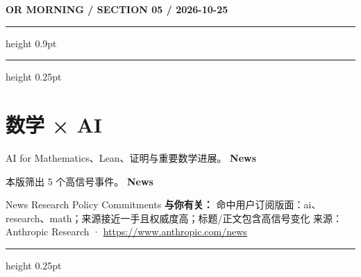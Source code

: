 \documentclass[10.5pt]{ctexart}
\begin{document}
\newpage
{\small\bfseries OR MORNING / SECTION 05 / 2026-10-25}
\vspace{2mm}
\hrule height 0.9pt
\vspace{1.5mm}
\hrule height 0.25pt
\vspace{4mm}
\section*{数学 × AI}
{\color{ormuted} AI for Mathematics、Lean、证明与重要数学进展。}
\vspace{2mm}
{\LARGE\bfseries News}\par
\vspace{1mm}
{\color{ormuted} 本版筛出 5 个高信号事件。}
\vspace{3mm}
{\Large\bfseries News}\par
News Research Policy Commitments
\textbf{与你有关：} 命中用户订阅版面：ai、research、math；来源接近一手且权威度高；标题/正文包含高信号变化
{\footnotesize\color{ormuted} 来源：Anthropic Research · \url{https://www.anthropic.com/news}}
\vspace{4mm}
\hrule height 0.25pt
\vspace{3mm}
\end{document}
